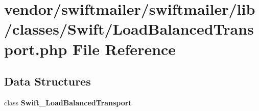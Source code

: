 \section{vendor/swiftmailer/swiftmailer/lib/classes/\+Swift/\+Load\+Balanced\+Transport.php File Reference}
\label{_load_balanced_transport_8php}
\subsection*{Data Structures}
\begin{DoxyCompactItemize}
\item 
class {\bf Swift\+\_\+\+Load\+Balanced\+Transport}
\end{DoxyCompactItemize}

